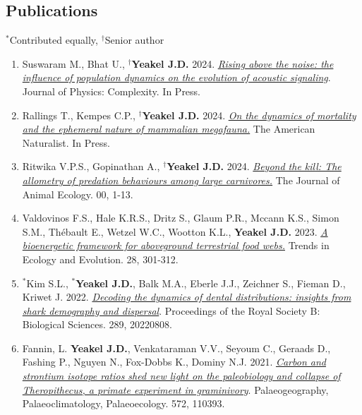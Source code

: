 \documentclass[margin,line,12pt]{res}
\newcommand\reverselabel[1]{%
  \def\theenumi{}%
  \renewcommand\makelabel{\makebox[\dimexpr\labelwidth-3pt\relax][r]{%
    \the\numexpr#1-\value{enumi}+1\relax}}}%
\begin{document}
\begin{resume}
\section{\sc Publications}
{\footnotesize{${}^\ast$Contributed equally, ${}^\dag$Senior author}}
\begin{enumerate}
  \reverselabel{41}

\item Suswaram M., Bhat U., \textbf{${}^\dag$Yeakel J.D.} 2024. \href{https://iopscience.iop.org/article/10.1088/2632-072X/ad5e2e}{\emph{Rising above the noise: the influence of population dynamics on the evolution of acoustic signaling}}. Journal of Physics: Complexity. In Press.

\item Rallings T., Kempes C.P., \textbf{${}^\dag$Yeakel J.D.} 2024. \href{https://www.journals.uchicago.edu/doi/abs/10.1086/731331}{\emph{On the dynamics of mortality and the ephemeral nature of mammalian megafauna.}} The American Naturalist. In Press.

\item Ritwika V.P.S., Gopinathan A., \textbf{${}^\dag$Yeakel J.D.} 2024. \href{https://besjournals.onlinelibrary.wiley.com/doi/10.1111/1365-2656.14070}{\emph{Beyond the kill: The allometry of predation behaviours among large carnivores.}} The Journal of Animal Ecology. 00, 1-13.

\item Valdovinos F.S., Hale K.R.S., Dritz S., Glaum P.R., Mccann K.S., Simon S.M., Thébault E., Wetzel W.C., Wootton K.L.,  \textbf{Yeakel J.D.} 2023. \href{https://www.sciencedirect.com/science/article/pii/S0169534722002841}{\emph{A bioenergetic framework for aboveground terrestrial food webs.}} Trends in Ecology and Evolution. 28, 301-312.

\item ${}^\ast$Kim S.L., \textbf{${}^\ast$Yeakel J.D.}, Balk M.A., Eberle J.J., Zeichner S., Fieman D., Kriwet J. 2022. \href{https://doi.org/10.1098/rspb.2022.0808}{\emph{Decoding the dynamics of dental distributions: insights from shark demography and dispersal}}. Proceedings of the Royal Society B: Biological Sciences. 289, 20220808.

\item Fannin, L. \textbf{Yeakel J.D.}, Venkataraman V.V., Seyoum C., Geraads D., Fashing P., Nguyen N., Fox-Dobbs K., Dominy N.J.  2021. \href{https://doi.org/10.1016/j.palaeo.2021.110393}{\emph{ Carbon and strontium isotope ratios shed new light on the paleobiology and collapse of Theropithecus, a primate experiment in graminivory}}. Palaeogeography, Palaeoclimatology, Palaeoecology. 572, 110393.


\end{enumerate}
\end{resume}
\end{document}
